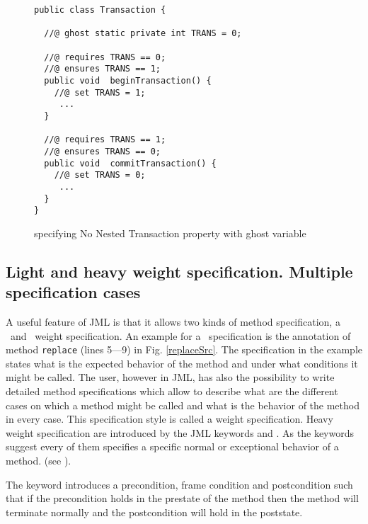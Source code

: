 \begin{figure}[ht!]
\begin{lstlisting}[frame=trbl] 
public class Transaction {

  //@ ghost static private int TRANS = 0; 
  
  //@ requires TRANS == 0;
  //@ ensures TRANS == 1;
  public void  beginTransaction() {
    //@ set TRANS = 1;
     ...
  }

  //@ requires TRANS == 1;
  //@ ensures TRANS == 0;
  public void  commitTransaction() {
    //@ set TRANS = 0; 
     ...
  }
}
\end{lstlisting}
\caption{\sc specifying No Nested Transaction property with ghost variable} 
\label{bml:ghost}
\end{figure}




\subsection{Light and heavy weight specification. Multiple specification cases}\label{javaVerif:JML:lightHeavy}
A useful feature of JML is that it allows two kinds of method specification, a \light  \ and \heavy \ weight specification. 
An example for a \light \  specification is the annotation of method \texttt{replace} (lines 5---9) in Fig. \ref{replaceSrc}. The specification in 
the example states what is the expected behavior of the method and under what conditions it might be called.
The user, however in JML, has also the possibility
to write detailed method specifications which allow 
to describe what are the different cases
on which a method might be called and what is the behavior of the method in
 every  case.
 This   specification style is called a \heavy{} weight specification.
 Heavy weight specification  are introduced by the JML keywords  and . As the keywords
suggest every of them specifies a specific normal or exceptional behavior of a method.  (see \cite{PD06LBR}). 

The keyword   introduces a precondition, frame condition and postcondition 
such that if the precondition holds in the prestate of the
 method then the method will terminate normally and the postcondition will hold in the poststate.

